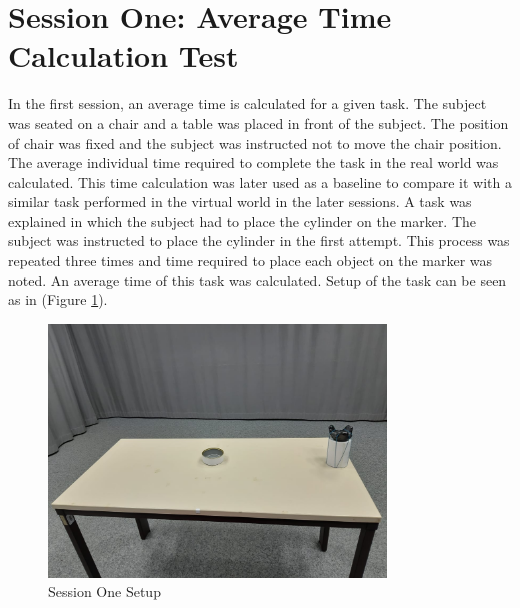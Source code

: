 \section{Session One: Average Time Calculation Test}
In the first session, an average time is calculated for a given task. The subject was seated on a chair and a table was placed in front of the subject. The position of chair was fixed and the subject was instructed not to move the chair position. The average individual time required to complete the task in the real world was calculated. This time calculation was later used as a baseline to compare it with a similar task performed in the virtual world in the later sessions. 
A task was explained in which the subject had to place the cylinder on the marker. The subject was instructed to place the cylinder in the first attempt. This process was repeated three times and time required to place each object on the marker was noted. An average time of this task was calculated. Setup of the task can be seen as in (Figure \ref{fig:fig3}).
\begin{figure}[h]
    \centering
    \includegraphics[width=0.8\textwidth]{./images/fig3.jpeg}
    \caption{Session One Setup}
    \label{fig:fig3}
\end{figure}


